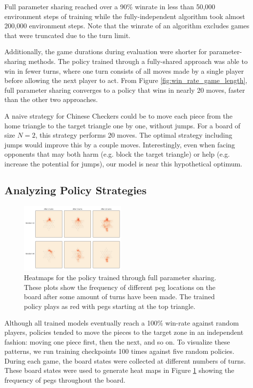 \documentclass[12pt, a4paper, twocolumn]{article}
\begin{document}
Full parameter sharing reached over a 90\% winrate in less than 50,000 environment steps of training while the fully-independent algorithm took almost 200,000 environment steps. Note that the winrate of an algorithm excludes games that were truncated due to the turn limit.

Additionally, the game durations during evaluation were shorter for parameter-sharing methods. The policy trained through a fully-shared approach was able to win in fewer turns, where one turn consists of all moves made by a single player before allowing the next player to act. From Figure \ref{fig:win_rate_game_length}, full parameter sharing converges to a policy that wins in nearly 20 moves, faster than the other two approaches.

A naive strategy for Chinese Checkers could be to move each piece from the home triangle to the target triangle one by one, without jumps. For a board of size $N = 2$, this strategy performs 20 moves. The optimal strategy including jumps would improve this by a couple moves. Interestingly, even when facing opponents that may both harm (e.g. block the target triangle) or help (e.g. increase the potential for jumps), our model is near this hypothetical optimum.

\subsection{Analyzing Policy Strategies}

\begin{figure}[h]
  \centering
    \includegraphics[width=0.47\textwidth]{images/random_heatmap.png}
  \caption{Heatmaps for the policy trained through full parameter sharing. These plots show the frequency of different peg locations on the board after some amount of turns have been made. The trained policy plays as red with pegs starting at the top triangle.}
  \label{fig:heatmap}
\end{figure}

Although all trained models eventually reach a 100\% win-rate against random players, policies tended to move the pieces to the target zone in an independent fashion: moving one piece first, then the next, and so on. To visualize these patterns, we run training checkpoints 100 times against five random policies. During each game, the board states were collected at different numbers of turns. These board states were used to generate heat maps in Figure \ref{fig:heatmap} showing the frequency of pegs throughout the board.
\end{document}
